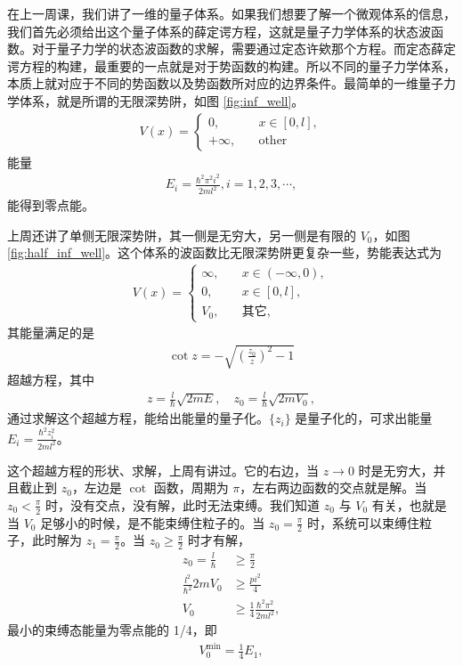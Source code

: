 在上一周课，我们讲了一维的量子体系。如果我们想要了解一个微观体系的信息，我们首先必须给出这个量子体系的薛定谔方程，这就是量子力学体系的状态波函数。对于量子力学的状态波函数的求解，需要通过定态许欸那个方程。而定态薛定谔方程的构建，最重要的一点就是对于势函数的构建。所以不同的量子力学体系，本质上就对应于不同的势函数以及势函数所对应的边界条件。最简单的一维量子力学体系，就是所谓的无限深势阱，如图 \ref{fig:inf_well}。
\begin{align}
    V(x) = 
    \begin{cases}
        0, \quad &x\in[0,l],\\
        +\infty, \quad &\text{other}
    \end{cases}
\end{align}
能量 \begin{align}
    E_i = \frac{\hbar^2\pi^2 i^2} {2ml^2}, i = 1,2,3,\cdots,
\end{align}能得到零点能。

上周还讲了单侧无限深势阱，其一侧是无穷大，另一侧是有限的 $V_0$，如图 \ref{fig:half_inf_well}。这个体系的波函数比无限深势阱更复杂一些，势能表达式为
\begin{align}
    V(x) = 
    \begin{cases}
        \infty, \quad & x \in (-\infty, 0),\\
        0, \quad&x \in [0,l],\\
        V_0, \quad &\text{其它},
    \end{cases}
\end{align}
其能量满足的是
\begin{align}
    \cot z = -\sqrt{\left( \frac{z_0}z \right)^2 - 1}
\end{align}
超越方程，其中
\begin{align}
    z = \frac l\hbar \sqrt{2 m E}, \quad z_0 = \frac{l}{\hbar} \sqrt{2mV_0},
\end{align}
通过求解这个超越方程，能给出能量的量子化。$\{z_i\}$ 是量子化的，可求出能量 $E_i = \frac{\hbar^2 z_i^2}{2ml^2}$。

这个超越方程的形状、求解，上周有讲过。它的右边，当 $z \rightarrow0$ 时是无穷大，并且截止到 $z_0$，左边是 $\cot$ 函数，周期为 $\pi$，左右两边函数的交点就是解。当 $z_0 < \frac{\pi}2$ 时，没有交点，没有解，此时无法束缚。我们知道 $z_0$ 与 $V_0$ 有关，也就是当 $V_0$ 足够小的时候，是不能束缚住粒子的。当 $z_0 = \frac{\pi}2$ 时，系统可以束缚住粒子，此时解为 $z_1 = \frac{\pi}2$。当 $z_0 \geqslant \frac{\pi}2$ 时才有解，
\begin{align}
    z_0 = \frac{l}{\hbar} &\geqslant \frac{\pi}2 \\
    \frac{l^2}{\hbar^2} 2 m V_0 &\geqslant \frac{pi^2}4 \\
    V_0 &\geqslant \frac14 \frac{\hbar^2\pi^2}{2ml^2},
\end{align}
最小的束缚态能量为零点能的 1/4，即
\begin{align}
    V_0^{\text{min}} = \frac14 E_1,
\end{align}

